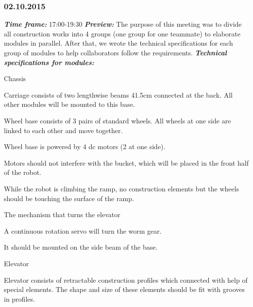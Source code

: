 \subsubsection{02.10.2015}
	\textit{\textbf{Time frame:}} 17:00-19:30 \newline
	\textit{\textbf{Preview:}} The purpose of this meeting was to divide all construction works into 4 groups (one group for one teammate) to elaborate modules in parallel. After that, we wrote the technical specifications for each group of modules to help collaborators follow the requirements. \newline \newline
	\textit{\textbf{Technical specifications for modules:}}
  \begin{enumerate*}
  	\item Chassis
  	\begin{enumerate*}
  		\item Carriage consists of two lengthwise beams 41.5cm connected at the back. All other modules will be mounted to this base. 
  		
  		\item Wheel base consists of 3 pairs of standard wheels. All wheels at one side are linked to each other and move together.
  		
  		\item Wheel base is powered by 4 dc motors (2 at one side). 
  		
  		\item Motors should not interfere with the bucket, which will be placed in the front half of the robot. 
  		
  		\item While the robot is climbing the ramp, no construction elements but the wheels should be touching the surface of the ramp. 
  		
  	\end{enumerate*}
  	
  	\item The mechanism that turns the elevator
  	\begin{enumerate*}
  		\item A continuous rotation servo will turn the worm gear.
  		
  		\item It should be mounted on the side beam of the base.
  	\end{enumerate*}
  	
  	\item Elevator
  	\begin{enumerate*}
  		\item Elevator consists of retractable construction profiles which connected with help of special elements. The shape and size of these elements should be fit with grooves in profiles.
  		

\end{enumerate*}
\end{enumerate*}
